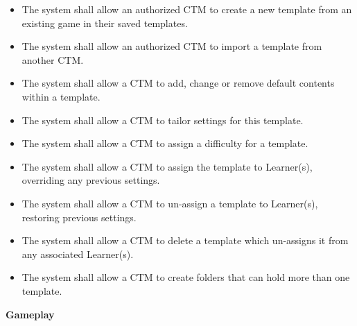 \documentclass[12pt]{article}
\newcounter{reqnumT} %
\begin{document}
\noindent \begin {itemize} 
  \setcounter{reqnumT}{0}

  \item[\refstepcounter{reqnumT}\thereqnumT \label{FR-TMPL-1}:] The system shall allow an authorized CTM to create a new template from an existing game in their saved templates.

  \item[\refstepcounter{reqnumT}\thereqnumT \label{FR-TMPL-2}:] The system shall allow an authorized CTM to import a template from another CTM.

  \item[\refstepcounter{reqnumT}\thereqnumT \label{FR-TMPL-3}:] The system shall allow a CTM to add, change or remove default contents within a template.

  \item[\refstepcounter{reqnumT}\thereqnumT \label{FR-TMPL-4}:] The system shall allow a CTM to tailor settings for this template.

  \item[\refstepcounter{reqnumT}\thereqnumT \label{FR-TMPL-5}:] The system shall allow a CTM to assign a difficulty for a template.

  \item[\refstepcounter{reqnumT}\thereqnumT \label{FR-TMPL-6}:] The system shall allow a CTM to assign the template to Learner(s), overriding any previous settings.

  \item[\refstepcounter{reqnumT}\thereqnumT \label{FR-TMPL-7}:] The system shall allow a CTM to un-assign a template to Learner(s), restoring previous settings.

  \item[\refstepcounter{reqnumT}\thereqnumT \label{FR-TMPL-8}:] The system shall allow a CTM to delete a template which un-assigns it from any associated Learner(s).

  \item[\refstepcounter{reqnumT}\thereqnumT \label{FR-TMPL-9}:] The system shall allow a CTM to create folders that can hold more than one template.
\end{itemize}

\noindent \textbf{Gameplay}
\end{document}

